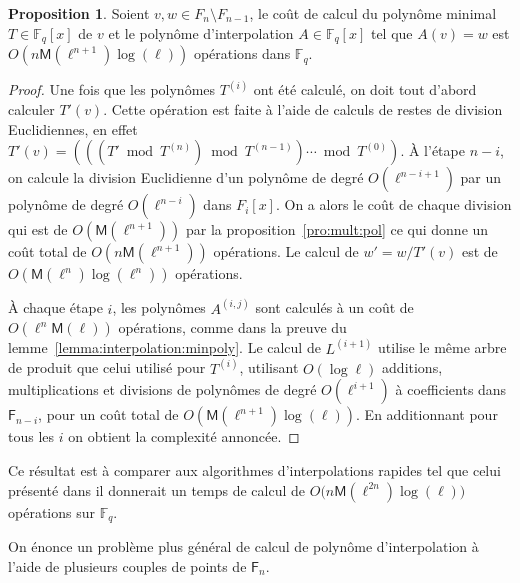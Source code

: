 \documentclass[10pt,a4paper]{book}
\theoremstyle{plain}
\theoremstyle{definition}
\theoremstyle{definition}
\theoremstyle{definition}
\theoremstyle{definition}
\newtheorem{prop}[thm]{Proposition}
\theoremstyle{definition}
\theoremstyle{remark}
\theoremstyle{remark}
\theoremstyle{definition}
\begin{document}
\begin{prop}
  Soient $v,w\in F_n\setminus F_{n-1}$, le coût de calcul du polynôme minimal
  $T\in \mathbb{F}_q[x]$ de $v$ et le polynôme d'interpolation $A\in 
  \mathbb{F}_q[x]$ tel que $A(v)=w$ est $O(n\mathsf{M}(\ell^{n+1})\log(\ell))$
  opérations dans $\mathbb{F}_q$.
\end{prop}
\begin{proof}
  Une fois que les polynômes $T^{(i)}$ ont été calculé, on doit tout d'abord 
  calculer $T'(v)$. Cette opération est faite à l'aide de calculs de restes de 
  division Euclidiennes, en effet
  $T'(v) = (((T' \bmod T^{(n)}) \bmod T^{(n-1)}) \cdots \bmod T^{(0)})$.
  \`A l'étape $n-i$, on calcule la division Euclidienne d'un polynôme de degré
   $O(\ell^{n-i+1})$ par un polynôme de degré $O(\ell^{n-i})$ dans  $F_i[x]$. 
   On a alors le coût de chaque division qui est de $O(\mathsf{M}(\ell^{n+1}))$ 
   par la proposition~\ref{pro:mult:pol} 
   ce qui donne un coût total de $O(n\mathsf{M}(\ell^{n+1}))$ opérations.
   Le calcul de $w'=w/T'(v)$ est de $O(\mathsf{M}(\ell^n)\log(\ell^n))$ opérations.

  \`A chaque étape $i$, les polynômes $A^{(i,j)}$ sont calculés à un coût de
  $O(\ell^n\mathsf{M}(\ell))$ opérations, comme dans la preuve du  
  lemme~\ref{lemma:interpolation:minpoly}.  Le calcul de $L^{(i+1)}$ utilise 
  le même arbre de produit que celui utilisé pour $T^{(i)}$, 
  utilisant $O(\log \ell)$ additions, multiplications et divisions de polynômes
  de degré $O(\ell^{i+1})$ à coefficients dans $\mathsf{F}_{n-i}$, pour un coût
   total de $O(\mathsf{M}(\ell^{n+1})\log(\ell))$. En additionnant pour tous les
  $i$ on obtient la complexité annoncée.
\end{proof}

Ce résultat est à comparer aux algorithmes d'interpolations rapides 
 tel que  celui présenté dans \cite[Chapter~10.2]{vzGJG03} il donnerait un temps
 de calcul de  $O\bigl(n\mathsf{M}(\ell^{2n})\log(\ell)\bigr)$ opérations sur 
 $\mathbb{F}_q$. 

On énonce un problème plus général de calcul de polynôme d'interpolation 
à l'aide de plusieurs couples de points de $\mathsf{F}_n$.
\end{document}
